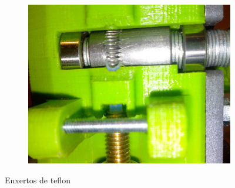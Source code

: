 \documentclass[11pt,a4paper]{article}
\begin{document}
\begin{figure}[H]
    ~ %
    \begin{subfigure}[b]{0.3\textwidth}
        \includegraphics[width=\textwidth,cfbox=azul_marcos 4pt 0pt]{FOTOS/TEFLON3}
    \end{subfigure}
    \caption*{Enxertos de teflon}
\end{figure}
\end{document}
